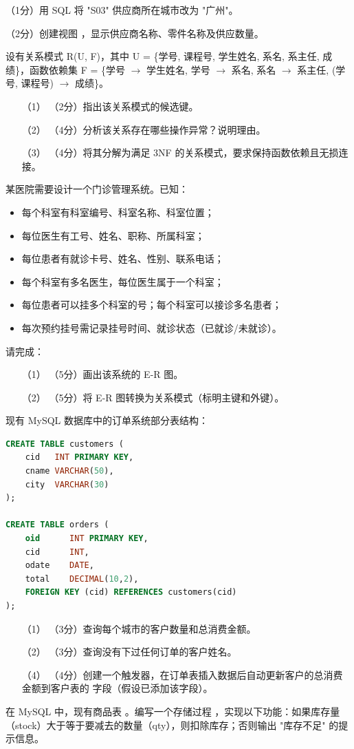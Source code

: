 \documentclass[a4paper,11pt]{article}
\begin{document}
\q （1分）用 SQL 将 "S03" 供应商所在城市改为 "广州"。
\anslines{0.8cm}

\q （2分）创建视图 ，显示供应商名称、零件名称及供应数量。
\anslines{1.2cm}


\q 设有关系模式 R(U, F)，其中 U = \{学号, 课程号, 学生姓名, 系名, 系主任, 成绩\}，函数依赖集 F = \{学号 $\rightarrow$ 学生姓名, 学号 $\rightarrow$ 系名, 系名 $\rightarrow$ 系主任, (学号, 课程号) $\rightarrow$ 成绩\}。
\begin{enumerate}[leftmargin=2em, itemsep=3pt]
  \item[（1）] （2分）指出该关系模式的候选键。
  \item[（2）] （4分）分析该关系存在哪些操作异常？说明理由。
  \item[（3）] （4分）将其分解为满足 3NF 的关系模式，要求保持函数依赖且无损连接。
\end{enumerate}
\anslines{4cm}


\q 某医院需要设计一个门诊管理系统。已知：
\begin{itemize}
  \item 每个科室有科室编号、科室名称、科室位置；
  \item 每位医生有工号、姓名、职称、所属科室；
  \item 每位患者有就诊卡号、姓名、性别、联系电话；
  \item 每个科室有多名医生，每位医生属于一个科室；
  \item 每位患者可以挂多个科室的号；每个科室可以接诊多名患者；
  \item 每次预约挂号需记录挂号时间、就诊状态（已就诊/未就诊）。
\end{itemize}
请完成：
\begin{enumerate}[leftmargin=2em, itemsep=3pt]
  \item[（1）] （5分）画出该系统的 E-R 图。
  \item[（2）] （5分）将 E-R 图转换为关系模式（标明主键和外键）。
\end{enumerate}
\anslines{5cm}


\q 现有 MySQL 数据库中的订单系统部分表结构：
\begin{lstlisting}[language=SQL]
CREATE TABLE customers (
    cid   INT PRIMARY KEY,
    cname VARCHAR(50),
    city  VARCHAR(30)
);

CREATE TABLE orders (
    oid      INT PRIMARY KEY,
    cid      INT,
    odate    DATE,
    total    DECIMAL(10,2),
    FOREIGN KEY (cid) REFERENCES customers(cid)
);
\end{lstlisting}
\begin{enumerate}[leftmargin=2em, itemsep=3pt]
  \item[（1）] （3分）查询每个城市的客户数量和总消费金额。
  \item[（2）] （3分）查询没有下过任何订单的客户姓名。
  \item[（4）] （4分）创建一个触发器，在订单表插入数据后自动更新客户的总消费金额到客户表的  字段（假设已添加该字段）。
\end{enumerate}
\anslines{3.5cm}

\q 在 MySQL 中，现有商品表 。编写一个存储过程 ，实现以下功能：如果库存量（stock）大于等于要减去的数量（qty），则扣除库存；否则输出 "库存不足" 的提示信息。
\anslines{4cm}
\end{document}
